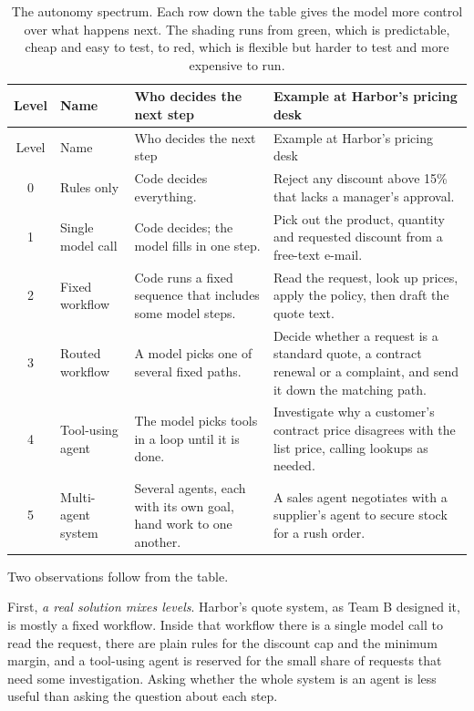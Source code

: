 \begingroup
\small
\begin{xltabular}{\textwidth}{@{}c>{\raggedright\arraybackslash}p{2.6cm}>{\raggedright\arraybackslash}X>{\raggedright\arraybackslash}X@{}}
\caption{The autonomy spectrum. Each row down the table gives the model more control over what happens next. The shading runs from green, which is predictable, cheap and easy to test, to red, which is flexible but harder to test and more expensive to run.}\label{tab:autonomy}\\
\toprule
Level & Name & Who decides the next step & Example at Harbor's pricing desk \\
\midrule
\endfirsthead
\toprule
Level & Name & Who decides the next step & Example at Harbor's pricing desk \\
\midrule
\endhead
{} 0 & Rules only & Code decides everything. & Reject any discount above 15\% that lacks a manager's approval. \\
 1 & Single model call & Code decides; the model fills in one step. & Pick out the product, quantity and requested discount from a free-text e-mail. \\
2 & Fixed workflow & Code runs a fixed sequence that includes some model steps. & Read the request, look up prices, apply the policy, then draft the quote text. \\
 3 & Routed workflow & A model picks one of several fixed paths. & Decide whether a request is a standard quote, a contract renewal or a complaint, and send it down the matching path. \\
 4 & Tool-using agent & The model picks tools in a loop until it is done. & Investigate why a customer's contract price disagrees with the list price, calling lookups as needed. \\
 5 & Multi-agent system & Several agents, each with its own goal, hand work to one another. & A sales agent negotiates with a supplier's agent to secure stock for a rush order. \\
\bottomrule
\end{xltabular}
\endgroup

Two observations follow from the table.

First, \emph{a real solution mixes levels}. Harbor's quote system, as Team B designed it, is mostly a fixed workflow. Inside that workflow there is a single model call to read the request, there are plain rules for the discount cap and the minimum margin, and a tool-using agent is reserved for the small share of requests that need some investigation. Asking whether the whole system is an agent is less useful than asking the question about each step.

